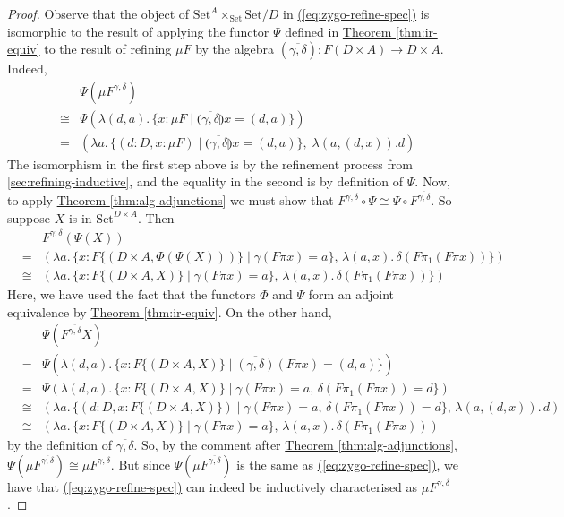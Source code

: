 \documentclass{LMCS}
\newcommand{\sepbar}{\mathrel|}
\newcommand{\fold}[1]{\llparenthesis #1 \rrparenthesis}
\newcommand{\Set}{\mathrm{Set}}
\newcommand{\parenref}[1]{\hyperref[#1]{(\ref*{#1})}}
\newcommand{\thmref}[1]{\hyperref[#1]{Theorem \ref*{#1}}}
\begin{document}
\begin{proof}
  Observe that the object of $\Set^A \times_{\Set} \Set/D$
  in \parenref{eq:zygo-refine-spec} is isomorphic to the result of
  applying the functor $\Psi$ defined in \thmref{thm:ir-equiv} to the
  result of refining $\mu F$ by the algebra
  $(\overline{\gamma,\delta}) : F(D \times A) \to D \times
  A$. Indeed,
  \begin{eqnarray*}
    &     & \Psi (\mu F^{\overline{\gamma,\delta}}) \\
    &\cong& \Psi (\lambda (d,a).\, \{ x : \mu F \sepbar
    \fold{\overline{\gamma,\delta}}x = (d,a) \}) \\
    &=    & (\lambda a.\, \{ (d : D, x : \mu F) \sepbar
    \fold{\overline{\gamma,\delta}}x = (d,a) \},\; \lambda (a,(d,x)).d)
  \end{eqnarray*}
  The isomorphism in the first step above is by the refinement process
  from \autoref{sec:refining-inductive}, and the equality in the
  second is by definition of $\Psi$. Now, to apply
  \thmref{thm:alg-adjunctions} we must show that $F^{\gamma,\delta}
  \circ \Psi \cong \Psi \circ F^{\overline{\gamma,\delta}}$. So
  suppose $X$ is in $\Set^{D \times A}$. Then
  \begin{eqnarray*}
    & & F^{\gamma,\delta}(\Psi(X)) \\
    &=& (\lambda a.\, \{x : F\{(D \times A,\Phi(\Psi(X)))\} \sepbar
    \gamma(F\pi x) = a \},\, 
    \lambda (a,x).\, \delta(F\pi_1(F\pi x)) \}) \\
    &\cong& (\lambda a.\, \{x : F\{(D \times A, X)\} \sepbar
    \gamma(F\pi x) = a \},\, \lambda (a,x).\, \delta(F\pi_1(F\pi x)) \})
 \end{eqnarray*}
 Here, we have used the fact that the functors $\Phi$ and $\Psi$ form
 an adjoint equivalence by \thmref{thm:ir-equiv}. On the other hand,
  \begin{eqnarray*}
    & & \Psi (F^{\overline{\gamma,\delta}} X) \\
    &=& \Psi (\lambda (d,a).\, \{x : F\{(D \times A,X)\} \sepbar
    \overline{(\gamma,\delta)}(F \pi x) = (d,a) \}) \\
    &=& \Psi (\lambda (d,a).\, \{x : F\{(D \times A,X)\} \sepbar \gamma(F \pi
    x) = a,\, \delta(F\pi_1(F\pi x)) = d \}) \\
    &\cong& (\lambda a.\, \{(d : D, x : F\{(D \times A,X)\}) \sepbar \gamma(F
    \pi x) = a,\, \delta(F \pi_1 (F \pi x)) = d\},\, \lambda (a, (d,x)).\, d) \\
    &\cong& (\lambda a.\, \{x : F\{(D \times A,X)\} \sepbar \gamma(F \pi x) =
    a\},\, \lambda (a, x).\, \delta(F \pi_1 (F \pi x)))
  \end{eqnarray*}
  by the definition of $\overline{\gamma,\delta}$. So, by the comment
  after \thmref{thm:alg-adjunctions}, $\Psi(\mu
  F^{\overline{\gamma,\delta}}) \cong \mu F^{\gamma,\delta}$. But
  since $\Psi(\mu F^{\overline{\gamma,\delta}})$ is the same
  as \parenref{eq:zygo-refine-spec}, we have
  that \parenref{eq:zygo-refine-spec} can indeed be inductively
  characterised as $\mu F^{\gamma,\delta}$.
\end{proof}
\end{document}
